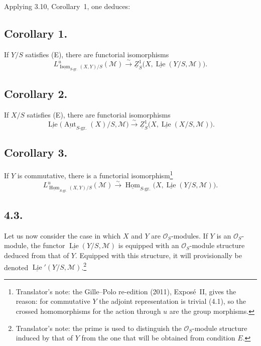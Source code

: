 Applying 3.10, Corollary~1, one deduces:

\subsection*{Corollary 1.}
If \(Y/S\) satisfies (E), there are functorial isomorphisms
\[
 L^u_{\underline{\operatorname{Isom}}_{S\text{-gr.}}(X,Y)/S}
   (\mathcal M)
 \xrightarrow{\sim}
 \underline Z^1_S
   \bigl(X,\underline{\operatorname{Lie}}(Y/S,\mathcal M)\bigr).
\]

\subsection*{Corollary 2.}
If \(X/S\) satisfies (E), there are functorial isomorphisms
\[
 \underline{\operatorname{Lie}}
   \bigl(\underline{\operatorname{Aut}}_{S\text{-gr.}}(X)/S,
         \mathcal M\bigr)
 \xrightarrow{\sim}
 \underline Z^1_S
   \bigl(X,\underline{\operatorname{Lie}}(X/S,\mathcal M)\bigr).
\]

\subsection*{Corollary 3.}
If \(Y\) is commutative, there is a functorial
isomorphism\footnote{Translator's note: the Gille--Polo re-edition (2011),
Expos\'e~II, gives the reason: for commutative \(Y\) the adjoint
representation is trivial (4.1), so the crossed homomorphisms for the
action through \(u\) are the group morphisms.}
\[
 L^u_{\underline{\operatorname{Hom}}_{S\text{-gr.}}(X,Y)/S}
   (\mathcal M)
 \xrightarrow{\sim}
 \underline{\operatorname{Hom}}_{S\text{-gr.}}
   \bigl(X,\underline{\operatorname{Lie}}(Y/S,\mathcal M)\bigr).
\]

\subsection*{4.3.}
Let us now consider the case in which \(X\) and \(Y\) are
\(\mathcal O_S\)-modules. If \(Y\) is an \(\mathcal O_S\)-module, the
functor \(\underline{\operatorname{Lie}}(Y/S,\mathcal M)\) is equipped with
an \(\mathcal O_S\)-module structure deduced from that of \(Y\). Equipped
with this structure, it will provisionally be denoted
\(\underline{\operatorname{Lie}}'(Y/S,\mathcal M)\).\footnote{Translator's note: the prime is used to distinguish the
\(\mathcal O_S\)-module structure induced by that of \(Y\) from the one
that will be obtained from condition \(E\).}

